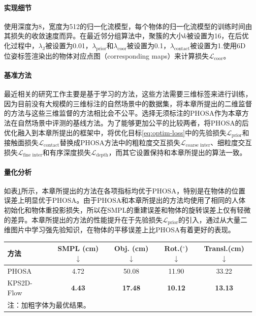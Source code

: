 \paragraph{实现细节}
使用深度为8，宽度为512的归一化流模型，每个物体的归一化流模型的训练时间由其损失的收敛速度而异。在最近邻分组算法中，聚簇的大小$k$被设置为16，在后优化过程中，$\lambda_{\text{J}}$被设置为0.01，$\lambda_{\text{prior}}$和$\lambda_{\text{coor}}$被设置为0.1，$\lambda_{\text{contact}}$被设置为1.使用6D位姿标签渲染出的物体对应点图（corresponding maps）来计算损失$\mathcal{L}_{\text{coor}}$。

\paragraph{基准方法}
最近相关的研究工作主要是基于学习的方法，这些方法需要三维标签来进行训练，因为目前没有大规模的三维标注的自然场景中的数据集，将本章所提出的二维监督的方法与这些三维监督的方法相比会不公平。选择无须标注的PHOSA作为本章方法在自然场景中评测的基线方法。为了能够更加公平的比较两者，将PHOSA的后优化融入到本章所提出的框架中，将优化目标\ref{eq:optim-loss}中的先验损失$\mathcal{L}_{\text{prior}}$和接触面损失$\mathcal{L}_{\text{contact}}$替换成PHOSA方法中的粗粒度交互损失$\mathcal{L}_{\text{coarse inter}}$、细粒度交互损失$\mathcal{L}_{\text{fine inter}}$和有序深度损失$\mathcal{L}_{\text{depth}}$，而其它设置保持和本章所提出的算法一致。

\paragraph{量化分析} 
如表\ref{tab:comparison_in_the_wild}所示，本章所提出的方法在各项指标均优于PHOSA，特别是在物体的位置误差上明显优于PHOSA。由于PHOSA和本章所提出的方法均使用了相同的人体初始化和物体重投影损失，所以在SMPL的重建误差和物体的旋转误差上仅有轻微的差异。本章所提出的方法的性能提升在于先验损失$\mathcal{L}_{\text{prior}}$的引入，通过从大量二维图片中学习强先验知识，在物体的平移误差上比PHOSA有着更好的表现。

\begin{table}[!htbp]
	\label{tab:comparison_in_the_wild}
	\centering
	\footnotesize
	\setlength{\tabcolsep}{4pt}
	\renewcommand{\arraystretch}{1.2}
	\begin{tabular}{lcccc}
		\toprule
		方法 & SMPL (cm) $\downarrow$ & Obj. (cm) $\downarrow$ & Rot.($^\circ$) $\downarrow$ & Transl.(cm) $\downarrow$ \\
		\hline
		PHOSA & 4.72 & 50.08 & 11.90 & 33.22 \\
		KPS2D-Flow & \textbf{4.43} & \textbf{17.48} & \textbf{10.12} & \textbf{13.13} \\
		\bottomrule
		\multicolumn{5}{l}{注：加粗字体为最优结果。}
	\end{tabular}
\end{table}

